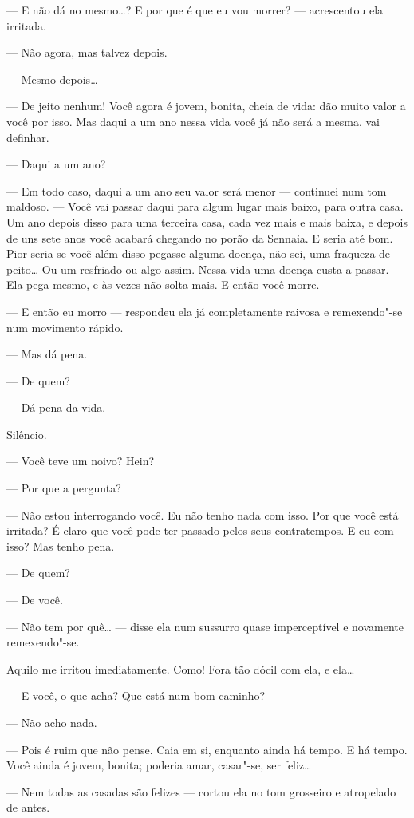--- E não dá no mesmo\ldots{}? E por que é que eu vou morrer? --- acrescentou ela
irritada.

--- Não agora, mas talvez depois.

--- Mesmo depois\ldots{}

--- De jeito nenhum! Você agora é jovem, bonita, cheia de vida: dão muito
valor a você por isso. Mas daqui a um ano nessa vida você já não será a
mesma, vai definhar.

--- Daqui a um ano?

--- Em todo caso, daqui a um ano seu valor será menor --- continuei num tom
maldoso. --- Você vai passar daqui para algum lugar mais baixo, para
outra casa. Um ano depois disso para uma terceira casa, cada vez mais e
mais baixa, e depois de uns sete anos você acabará chegando no porão da
Sennaia. E seria até bom. Pior seria se você além disso pegasse alguma
doença, não sei, uma fraqueza de peito\ldots{} Ou um resfriado ou algo
assim. Nessa vida uma doença custa a passar. Ela pega mesmo, e às vezes
não solta mais. E então você morre.

--- E então eu morro --- respondeu ela já completamente raivosa e
remexendo"-se num movimento rápido.

--- Mas dá pena.

--- De quem?

--- Dá pena da vida.

Silêncio.

--- Você teve um noivo? Hein?

--- Por que a pergunta?

--- Não estou interrogando você. Eu não tenho nada com isso. Por que você
está irritada? É claro que você pode ter passado pelos seus
contratempos. E eu com isso? Mas tenho pena.

--- De quem?

--- De você.

--- Não tem por quê\ldots{} --- disse ela num sussurro quase imperceptível e
novamente remexendo"-se.

Aquilo me irritou imediatamente. Como! Fora tão dócil com ela, e ela\ldots{}

--- E você, o que acha? Que está num bom caminho?

--- Não acho nada.

--- Pois é ruim que não pense. Caia em si, enquanto ainda há tempo. E há
tempo. Você ainda é jovem, bonita; poderia amar, casar"-se, ser feliz\ldots{}

--- Nem todas as casadas são felizes --- cortou ela no tom grosseiro e
atropelado de antes.


